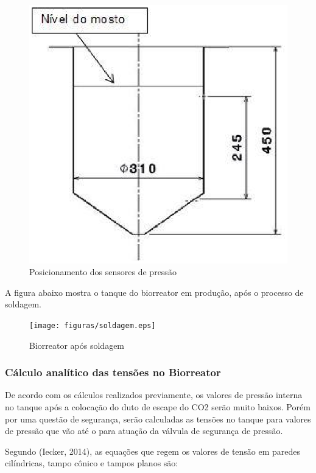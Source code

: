 \begin{figure}[h]
 \centering
 \includegraphics[keepaspectratio=true,scale=0.5]{figuras/nivel.eps}
 \caption{Posicionamento dos sensores de pressão}
 \label{nivel}
\end{figure}

A figura abaixo mostra o tanque do biorreator em produção, após o processo de soldagem.

\begin{figure}[h]
 \centering
 \texttt{[image: figuras/soldagem.eps]}
 \caption{Biorreator após soldagem}
 \label{soldagem}
\end{figure}

\subsubsection{Cálculo analítico das tensões no Biorreator}

De acordo com os cálculos realizados previamente, os valores de pressão interna no tanque após a colocação do duto de escape do CO2 serão muito baixos. Porém por uma questão de segurança, serão calculadas as tensões no tanque para valores de pressão que vão até o para atuação da válvula de segurança de pressão.

Segundo (Iecker, 2014), as equações que regem os valores de tensão em paredes cilíndricas, tampo cônico e tampos planos são:

